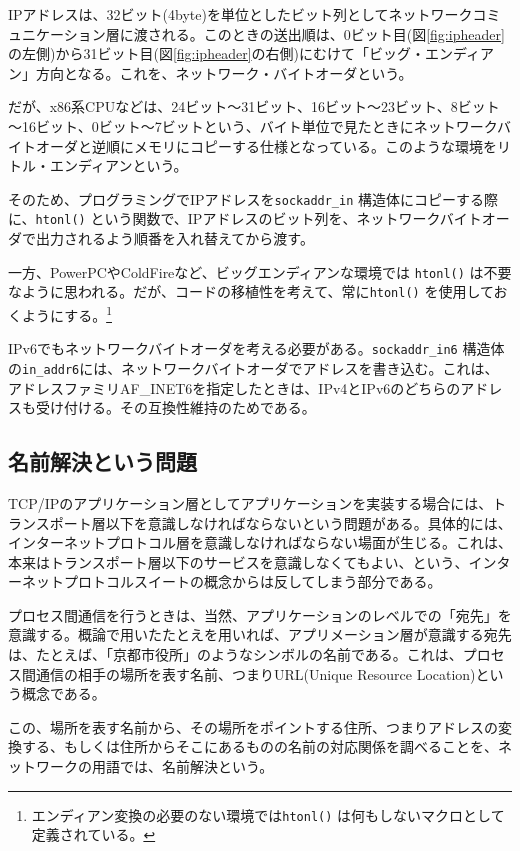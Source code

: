 IPアドレスは、32ビット(4byte)を単位としたビット列としてネットワークコミュニケーション層に渡される。このときの送出順は、0ビット目(図\ref{fig:ipheader}の左側)から31ビット目(図\ref{fig:ipheader}の右側)にむけて「ビッグ・エンディアン」方向となる。これを、ネットワーク・バイトオーダという。

だが、x86系CPUなどは、24ビット～31ビット、16ビット～23ビット、8ビット～16ビット、0ビット～7ビットという、バイト単位で見たときにネットワークバイトオーダと逆順にメモリにコピーする仕様となっている。このような環境をリトル・エンディアンという。

そのため、プログラミングでIPアドレスを\verb+sockaddr_in+ 構造体にコピーする際に、\verb+htonl()+ という関数で、IPアドレスのビット列を、ネットワークバイトオーダで出力されるよう順番を入れ替えてから渡す。

一方、PowerPCやColdFireなど、ビッグエンディアンな環境では \verb+htonl()+ は不要なように思われる。だが、コードの移植性を考えて、常に\verb+htonl()+ を使用しておくようにする。\footnote{エンディアン変換の必要のない環境では\verb+htonl()+ は何もしないマクロとして定義されている。}

IPv6でもネットワークバイトオーダを考える必要がある。\verb+sockaddr_in6+ 構造体の\verb+in_addr6+には、ネットワークバイトオーダでアドレスを書き込む。これは、アドレスファミリAF\_INET6を指定したときは、IPv4とIPv6のどちらのアドレスも受け付ける。その互換性維持のためである。

\subsection{名前解決という問題}
TCP/IPのアプリケーション層としてアプリケーションを実装する場合には、トランスポート層以下を意識しなければならないという問題がある。具体的には、インターネットプロトコル層を意識しなければならない場面が生じる。これは、本来はトランスポート層以下のサービスを意識しなくてもよい、という、インターネットプロトコルスイートの概念からは反してしまう部分である。

プロセス間通信を行うときは、当然、アプリケーションのレベルでの「宛先」を意識する。概論で用いたたとえを用いれば、アプリメーション層が意識する宛先は、たとえば、「京都市役所」のようなシンボルの名前である。これは、プロセス間通信の相手の場所を表す名前、つまりURL(Unique Resource Location)という概念である。

この、場所を表す名前から、その場所をポイントする住所、つまりアドレスの変換する、もしくは住所からそこにあるものの名前の対応関係を調べることを、ネットワークの用語では、名前解決という。

